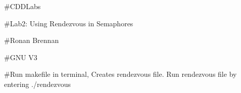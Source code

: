 \#\+C\+D\+D\+Labs

\#\+Lab2\+: Using Rendezvous in Semaphores

\#\+Ronan Brennan

\#\+G\+NU V3

\#\+Run makefile in terminal, Creates rendezvous file. Run rendezvous file by entering ./rendezvous 